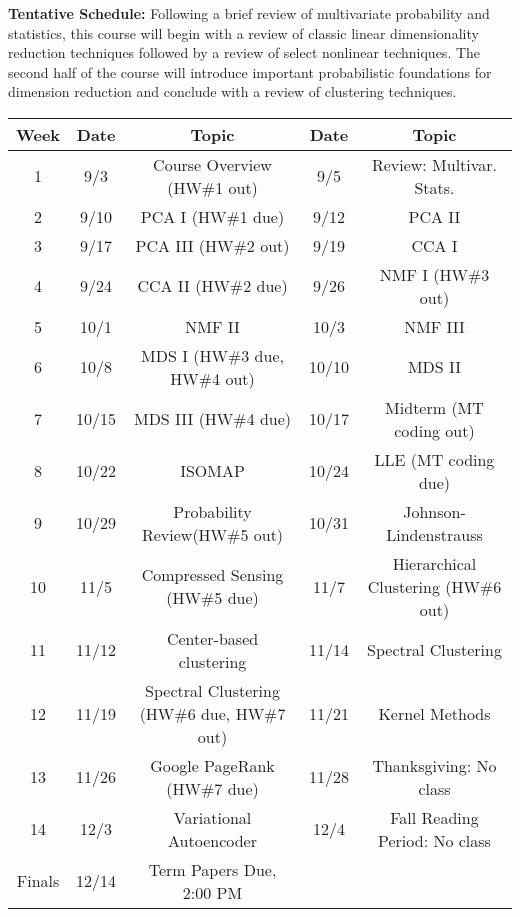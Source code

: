 \documentclass[12 point]{article}
\begin{document}
\newpage
{\bf Tentative Schedule: } Following a brief review of multivariate probability and statistics, this course will begin with a review of classic linear dimensionality reduction techniques followed by a review of select nonlinear techniques.  The second half of the course will introduce  important probabilistic foundations for dimension reduction and conclude with a review of clustering techniques.
\begin{center}
\renewcommand{\arraystretch}{1.25}
\begin{table}[h!]
\begin{tabular}{|c|c|c|c|c|}
\hline
Week & Date & Topic & Date & Topic \\
\hline
1 & 9/3&   Course Overview (HW\#1 out)  & 9/5 & Review: Multivar. Stats. \\
\hline
2 & 9/10 & 	 PCA	I (HW\#1 due) & 9/12& PCA II \\
\hline
3 & 9/17 & PCA III  (HW\#2 out)& 9/19 & CCA I    \\
 \hline 
 4 & 9/24 & CCA II  (HW\#2 due)& 9/26 & NMF I (HW\#3 out)   \\
 \hline
 5 & 10/1 &  NMF II   & 10/3 & NMF III  \\
 \hline 
 6 & 10/8 & MDS I (HW\#3 due, HW\#4 out)  & 10/10 & MDS II \\
 \hline 
 7 & 10/15 & MDS III (HW\#4 due)   & 10/17 & Midterm (MT coding out)  \\ 
 \hline
 8 & 10/22 & ISOMAP  & 10/24 & LLE  (MT coding due)   \\ 
 \hline
 9 & 10/29 &  Probability Review(HW\#5 out) &10/31 &  Johnson-Lindenstrauss  \\
 \hline
 10 & 11/5 & Compressed Sensing (HW\#5 due)   & 11/7  &  Hierarchical Clustering (HW\#6 out)  \\
 \hline
 11 & 11/12 &  Center-based clustering  & 11/14 &  Spectral Clustering    \\
 \hline
 12 & 11/19 &  Spectral Clustering (HW\#6 due, HW\#7 out) & 11/21 & Kernel Methods \\
 \hline
 13 & 11/26 &  Google PageRank (HW\#7 due)  & 11/28 & Thanksgiving: No class \\ 
 \hline
 14 & 12/3 &  Variational Autoencoder & 12/4 & Fall Reading Period: No class \\
 \hline
 Finals & 12/14 & Term Papers Due, 2:00 PM &  & \\
\hline
\end{tabular}
\end{table}
\end{center}
\end{document}
